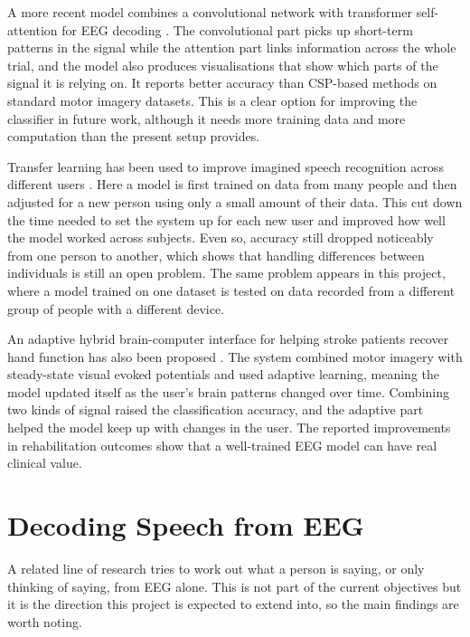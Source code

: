 A more recent model combines a convolutional network with transformer self-attention for
EEG decoding \cite{song2023conformer}. The convolutional part picks up short-term patterns
in the signal while the attention part links information across the whole trial, and the
model also produces visualisations that show which parts of the signal it is relying on.
It reports better accuracy than CSP-based methods on standard motor imagery datasets. This
is a clear option for improving the classifier in future work, although it needs more
training data and more computation than the present setup provides.

Transfer learning has been used to improve imagined speech recognition across different
users \cite{jerrin2021imagined}. Here a model is first trained on data from many people and
then adjusted for a new person using only a small amount of their data. This cut down the
time needed to set the system up for each new user and improved how well the model worked
across subjects. Even so, accuracy still dropped noticeably from one person to another,
which shows that handling differences between individuals is still an open problem. The
same problem appears in this project, where a model trained on one dataset is tested on
data recorded from a different group of people with a different device.

An adaptive hybrid brain-computer interface for helping stroke patients recover hand
function has also been proposed \cite{su2024hybrid}. The system combined motor imagery with
steady-state visual evoked potentials and used adaptive learning, meaning the model updated
itself as the user's brain patterns changed over time. Combining two kinds of signal raised
the classification accuracy, and the adaptive part helped the model keep up with changes in
the user. The reported improvements in rehabilitation outcomes show that a well-trained EEG
model can have real clinical value.

\section{Decoding Speech from EEG}

A related line of research tries to work out what a person is saying, or only thinking of
saying, from EEG alone. This is not part of the current objectives but it is the direction
this project is expected to extend into, so the main findings are worth noting.

